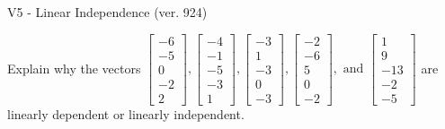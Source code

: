\begin{exercise}
  \begin{exerciseTitle}V5 - Linear Independence (ver. 924)\end{exerciseTitle}
  \begin{exerciseStatement}
    Explain why the vectors \(\left[\begin{array}{r}
-6 \\
-5 \\
0 \\
-2 \\
2
\end{array}\right] , \left[\begin{array}{r}
-4 \\
-1 \\
-5 \\
-3 \\
1
\end{array}\right] , \left[\begin{array}{r}
-3 \\
1 \\
-3 \\
0 \\
-3
\end{array}\right] , \left[\begin{array}{r}
-2 \\
-6 \\
5 \\
0 \\
-2
\end{array}\right] , \text{ and } \left[\begin{array}{r}
1 \\
9 \\
-13 \\
-2 \\
-5
\end{array}\right]\) are linearly dependent or linearly independent.	



\end{exerciseStatement}
\end{exercise}

